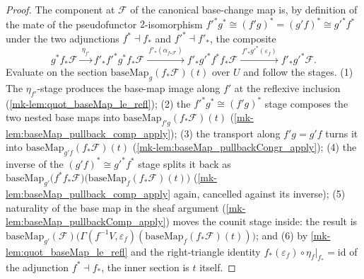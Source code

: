\begin{proof}
  \leanok{}
  The component at \(\mathcal F\) of the canonical base-change map is, by
  definition of the mate of the pseudofunctor \(2\)-isomorphism
  \(f'^* g^* \cong (f' g)^* = (g' f)^* \cong g'^* f^*\) under the two
  adjunctions \(f^* \dashv f_*\) and \(f'^* \dashv f'_*\), the composite
  \[
    g^* f_* \mathcal F
    \xrightarrow{\ \eta_{f'}\ }
    f'_* f'^* g^* f_* \mathcal F
    \xrightarrow{\ f'_*(\alpha_{f_*\mathcal F})\ }
    f'_* g'^* f^* f_* \mathcal F
    \xrightarrow{\ f'_* g'^*(\varepsilon_f)\ }
    f'_* g'^* \mathcal F .
  \]
  Evaluate on the section \(\mathrm{baseMap}_g(f_*\mathcal F)(t)\) over
  \(U\) and follow the stages. (1) The \(\eta_{f'}\)-stage produces the
  base-map image along \(f'\) at the reflexive inclusion
  (\ref{mk-lem:quot_baseMap_le_refl}); (2) the
  \(f'^* g^* \cong (f' g)^*\) stage composes the two nested base maps into
  \(\mathrm{baseMap}_{f' g}(f_*\mathcal F)(t)\)
  (\ref{mk-lem:baseMap_pullback_comp_apply}); (3) the transport along
  \(f' g = g' f\) turns it into
  \(\mathrm{baseMap}_{g' f}(f_*\mathcal F)(t)\)
  (\ref{mk-lem:baseMap_pullbackCongr_apply}); (4) the inverse of the
  \((g' f)^* \cong g'^* f^*\) stage splits it back as
  \(\mathrm{baseMap}_{g'}\bigl(f^* f_* \mathcal F\bigr)
    \bigl(\mathrm{baseMap}_{f}(f_*\mathcal F)(t)\bigr)\)
  (\ref{mk-lem:baseMap_pullback_comp_apply} again, cancelled against its
  inverse); (5) naturality of the base map in the sheaf argument
  (\ref{mk-lem:baseMap_pullbackComp_apply}) moves the counit stage inside:
  the result is
  \(\mathrm{baseMap}_{g'}(\mathcal F)\bigl(
     \Gamma(f^{-1}V, \varepsilon_f)(\mathrm{baseMap}_{f}(f_*\mathcal F)(t))
   \bigr)\);
  and (6) by \ref{mk-lem:quot_baseMap_le_refl} and the right-triangle
  identity \(f_*(\varepsilon_f) \circ \eta_{f}|_{f_*} = \mathrm{id}\) of the
  adjunction \(f^* \dashv f_*\), the inner section is \(t\) itself.
\end{proof}


